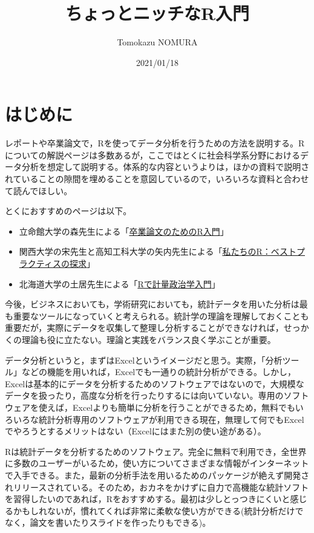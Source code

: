 \documentclass[
]{book}
\title{ちょっとニッチなR入門}
\author{Tomokazu NOMURA}
\date{2021/01/18}
\providecommand{\tightlist}{%
  \setlength{\itemsep}{0pt}\setlength{\parskip}{0pt}}
\begin{document}
\maketitle

{
\setcounter{tocdepth}{1}
\tableofcontents
}
\hypertarget{ux306fux3058ux3081ux306b}{%
\chapter{はじめに}\label{ux306fux3058ux3081ux306b}}

レポートや卒業論文で，Rを使ってデータ分析を行うための方法を説明する。Rについての解説ページは多数あるが，ここではとくに社会科学系分野におけるデータ分析を想定して説明する。体系的な内容というよりは，ほかの資料で説明されていることの隙間を埋めることを意図しているので，いろいろな資料と合わせて読んでほしい。

とくにおすすめのページは以下。

\begin{itemize}
\tightlist
\item
  立命館大学の森先生による「\href{https://tomoecon.github.io/R_for_graduate_thesis/}{卒業論文のためのR入門}」
\item
  関西大学の宋先生と高知工科大学の矢内先生による「\href{https://www.jaysong.net/RBook/}{私たちのR：ベストプラクティスの探求}」
\item
  北海道大学の土居先生による「\href{https://shohei-doi.github.io/quant_polisci/index.html}{Rで計量政治学入門}」
\end{itemize}

今後，ビジネスにおいても，学術研究においても，統計データを用いた分析は最も重要なツールになっていくと考えられる。統計学の理論を理解しておくことも重要だが，実際にデータを収集して整理し分析することができなければ，せっかくの理論も役に立たない。理論と実践をバランス良く学ぶことが重要。

データ分析というと，まずはExcelというイメージだと思う。実際，「分析ツール」などの機能を用いれば，Excelでも一通りの統計分析ができる。しかし，Excelは基本的にデータを分析するためのソフトウェアではないので，大規模なデータを扱ったり，高度な分析を行ったりするには向いていない。専用のソフトウェアを使えば，Excelよりも簡単に分析を行うことができるため，無料でもいろいろな統計分析専用のソフトウェアが利用できる現在，無理して何でもExcelでやろうとするメリットはない（Excelにはまた別の使い途がある）。

Rは統計データを分析するためのソフトウェア。完全に無料で利用でき，全世界に多数のユーザーがいるため，使い方についてさまざまな情報がインターネットで入手できる。また，最新の分析手法を用いるためのパッケージが絶えず開発されリリースされている。そのため，おカネをかけずに自力で高機能な統計ソフトを習得したいのであれば，Rをおすすめする。最初は少しとっつきにくいと感じるかもしれないが，慣れてくれば非常に柔軟な使い方ができる(統計分析だけでなく，論文を書いたりスライドを作ったりもできる)。
\end{document}
